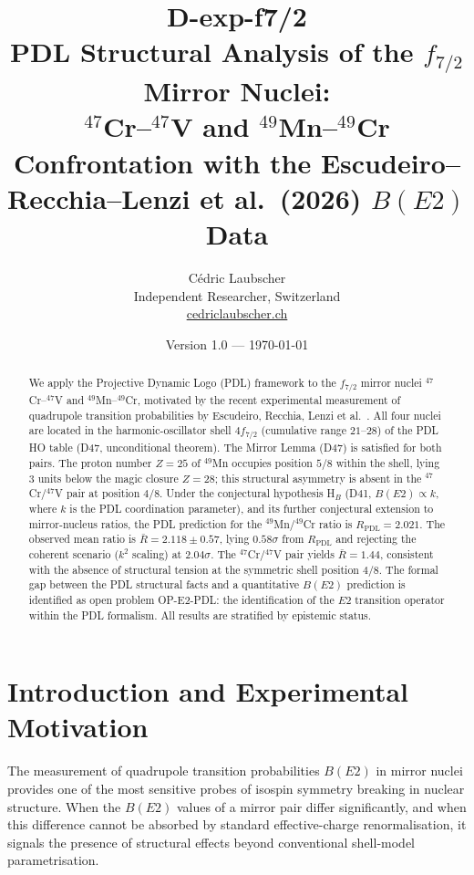 \documentclass[12pt,a4paper]{article}
\title{\textbf{D-exp-f7/2}\\[0.4em]
\large PDL Structural Analysis of the $f_{7/2}$ Mirror Nuclei:\\
$^{47}$Cr--$^{47}$V and $^{49}$Mn--$^{49}$Cr\\[0.3em]
\normalsize Confrontation with the Escudeiro--Recchia--Lenzi et al.\ (2026) $B(E2)$ Data}
\author{C\'edric Laubscher\\[0.3em]
\small Independent Researcher, Switzerland\\
\small \href{https://cedriclaubscher.ch}{cedriclaubscher.ch}}
\date{Version 1.0 --- \today}
\theoremstyle{remark}
\begin{document}
\maketitle
\thispagestyle{empty}

\begin{abstract}
We apply the Projective Dynamic Logo (PDL) framework to the $f_{7/2}$ mirror nuclei $^{47}$Cr--$^{47}$V and $^{49}$Mn--$^{49}$Cr, motivated by the recent experimental measurement of quadrupole transition probabilities by Escudeiro, Recchia, Lenzi et al.\ \cite{Escudeiro_2026}. All four nuclei are located in the harmonic-oscillator shell $4f_{7/2}$ (cumulative range $21$--$28$) of the PDL HO table (D47, unconditional theorem). The Mirror Lemma (D47) is satisfied for both pairs. The proton number $Z = 25$ of $^{49}$Mn occupies position $5/8$ within the shell, lying 3 units below the magic closure $Z = 28$; this structural asymmetry is absent in the $^{47}$Cr/$^{47}$V pair at position $4/8$. Under the conjectural hypothesis H$_B$ (D41, $B(E2) \propto k$, where $k$ is the PDL coordination parameter), and its further conjectural extension to mirror-nucleus ratios, the PDL prediction for the $^{49}$Mn/$^{49}$Cr ratio is $R_{\text{PDL}} = 2.021$. The observed mean ratio is $\bar{R} = 2.118 \pm 0.57$, lying $0.58\sigma$ from $R_{\text{PDL}}$ and rejecting the coherent scenario ($k^2$ scaling) at $2.04\sigma$. The $^{47}$Cr/$^{47}$V pair yields $\bar{R} = 1.44$, consistent with the absence of structural tension at the symmetric shell position $4/8$. The formal gap between the PDL structural facts and a quantitative $B(E2)$ prediction is identified as open problem OP-E2-PDL: the identification of the $E2$ transition operator within the PDL formalism. All results are stratified by epistemic status.
\end{abstract}

\clearpage

\tableofcontents
\newpage

\section{Introduction and Experimental Motivation}
\label{sec:intro}

The measurement of quadrupole transition probabilities $B(E2)$ in mirror nuclei provides one of the most sensitive probes of isospin symmetry breaking in nuclear structure. When the $B(E2)$ values of a mirror pair differ significantly, and when this difference cannot be absorbed by standard effective-charge renormalisation, it signals the presence of structural effects beyond conventional shell-model parametrisation.
\end{document}
